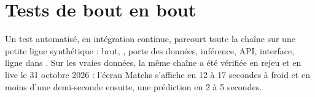 \section{Tests de bout en bout}

Un test automatisé, en intégration continue, parcourt toute la chaîne sur une petite ligue synthétique :
brut, , porte des données, inférence, API, interface, ligne dans . Sur
les vraies données, la même chaîne a été vérifiée en rejeu et en live le 31 octobre 2026 : l'écran
\og Matchs \fg{} s'affiche en 12 à 17 secondes à froid et en moins d'une demi-seconde ensuite, une
prédiction en 2 à 5 secondes.
